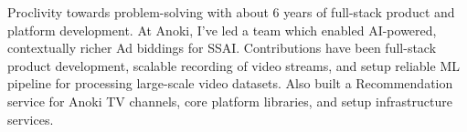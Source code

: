 
Proclivity towards problem-solving with about 6 years of full-stack product and platform development. At Anoki, I've led a team which enabled AI-powered, contextually richer Ad biddings for SSAI.
Contributions have been full-stack product development, scalable recording of video streams, and setup reliable ML pipeline for processing large-scale video datasets.
Also built a Recommendation service for Anoki TV channels, core platform libraries, and setup infrastructure services.

